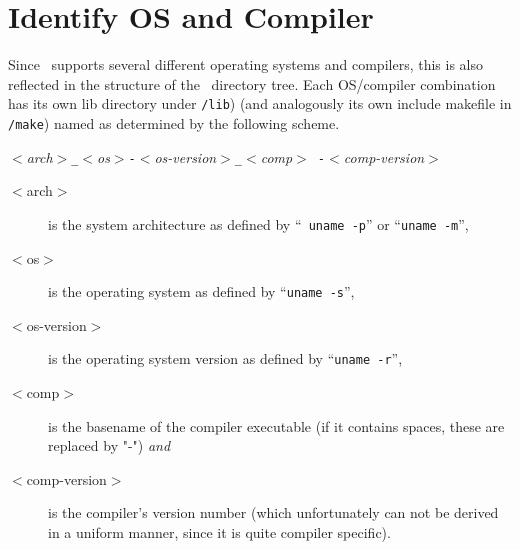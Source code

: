 


\section{Identify OS and Compiler\label{sec:os-compiler-id}}

Since \cgal\ supports several different operating systems and
compilers, this is also reflected in the structure of the \cgal\
directory tree. Each OS/compiler combination has its own lib directory
under \texttt{\cgaldir/lib}) (and analogously its own include
makefile in \texttt{\cgaldir/make}) named as
determined by the following scheme.
\begin{center}
  \textit{$<$arch$>$\texttt{\_}$<$os$>$\texttt{-}$<$os-version$>$\texttt{\_}$<$comp$>${\tt
    -}$<$comp-version$>$}
\end{center}

\begin{description}
\item[$<$arch$>$] is the system architecture as defined by ``{\tt
    uname -p}'' or ``\texttt{uname -m}'',
\item[$<$os$>$] is the operating system as defined by ``\texttt{uname
    -s}'',
\item[$<$os-version$>$] is the operating system version as defined by
  ``\texttt{uname -r}'',
\item[$<$comp$>$] is the basename of the compiler executable (if it
  contains spaces, these are replaced by "-") \textit{and}
\item[$<$comp-version$>$] is the compiler's version number (which
  unfortunately can not be derived in a uniform manner, since it is
  quite compiler specific).
\end{description}

